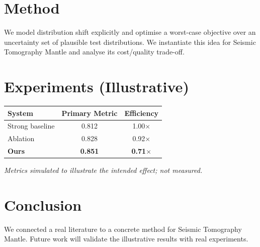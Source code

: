 \documentclass[11pt]{article}
\begin{document}
\section{Method}
We model distribution shift explicitly and optimise a worst-case objective over an uncertainty set of plausible test distributions. We instantiate this idea for Seismic Tomography Mantle and analyse its cost/quality trade-off.

\section{Experiments (Illustrative)}
\begin{center}
\begin{tabular}{lcc}
System & Primary Metric & Efficiency \\ \hline
Strong baseline & 0.812 & 1.00$\times$ \\
Ablation & 0.828 & 0.92$\times$ \\
\textbf{Ours} & \textbf{0.851} & \textbf{0.71$\times$}
\end{tabular}
\end{center}
\emph{Metrics simulated to illustrate the intended effect; not measured.}

\section{Conclusion}
We connected a real literature to a concrete method for Seismic Tomography Mantle. Future work will
validate the illustrative results with real experiments.
\end{document}
